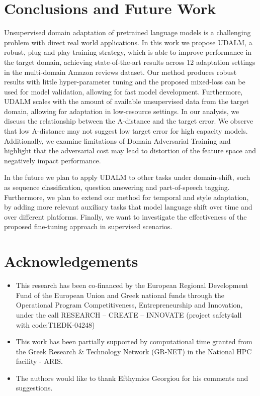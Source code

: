 \documentclass[11pt]{article}
\begin{document}
\section{Conclusions and Future Work}

Unsupervised domain adaptation of pretrained language models is a challenging problem with direct real world applications. 
In this work we propose UDALM, a robust, plug and play training strategy, which is able to improve performance in the target domain, achieving state-of-the-art results across $12$ adaptation settings in the multi-domain Amazon reviews dataset. 
Our method produces robust results with little hyper-parameter tuning and the proposed mixed-loss can be used for model validation, allowing for fast model development.
Furthermore, UDALM scales with the amount of available unsupervised data from the target domain, allowing for adaptation in low-resource settings.
In our analysis, we discuss the relationship between the A-distance and the target error. We observe that low A-distance may not suggest low target error for high capacity models. Additionally, we examine limitations of Domain Adversarial Training and highlight that the adversarial cost may lead to distortion of the feature space and negatively impact performance.


In the future we plan to apply UDALM to other tasks under domain-shift, such as sequence classification, question answering and part-of-speech tagging.
Furthermore, we plan to extend our method for temporal and style adaptation, by adding more relevant auxiliary tasks that model language shift over time and over different platforms. Finally, we want to investigate the effectiveness of the proposed fine-tuning approach in supervised scenarios.

\section*{Acknowledgements}
\begin{itemize}
    \item This research has been co‐financed by the European Regional Development Fund of the European Union and Greek national funds through the Operational Program Competitiveness, Entrepreneurship and Innovation, under the call RESEARCH – CREATE – INNOVATE (project safety4all with code:T1EDK-04248)
    \item This work has been partially supported by computational time granted from the Greek Research \& Technology Network (GR-NET) in the National HPC facility - ARIS.
    \item The authors would like to thank Efthymios Georgiou for his comments and suggestions.
\end{itemize}




\end{document}

